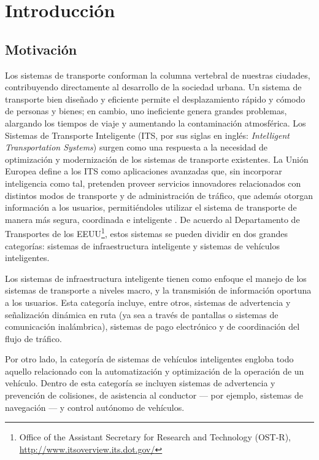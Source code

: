 \chapter{Introducción}
\section{Motivación}

Los sistemas de transporte conforman la columna vertebral de nuestras ciudades, contribuyendo directamente al desarrollo de la sociedad urbana. Un sistema de transporte bien diseñado y eficiente permite el desplazamiento rápido y cómodo de personas y bienes; en cambio, uno ineficiente genera grandes problemas, alargando los tiempos de viaje y aumentando la contaminación atmosférica.
Los Sistemas de Transporte Inteligente (ITS, por sus siglas en inglés: \textit{Intelligent Transportation Systems}) surgen como una respuesta a la necesidad de optimización y modernización de los sistemas de transporte existentes. La Unión Europea define a los ITS como aplicaciones avanzadas que, sin incorporar inteligencia como tal, pretenden proveer servicios innovadores relacionados con distintos modos de transporte y de administración de tráfico, que además otorgan información a los usuarios, permitiéndoles utilizar el sistema de transporte de manera más segura, coordinada e inteligente \cite{eudirective}. De acuerdo al Departamento de Transportes de los EEUU\footnote{Office of the Assistant Secretary for Research and Technology (OST-R), \url{http://www.itsoverview.its.dot.gov/}}, estos sistemas se pueden dividir en dos grandes categorías: sistemas de infraestructura inteligente y sistemas de vehículos inteligentes.

Los sistemas de infraestructura inteligente tienen como enfoque el manejo de los sistemas de transporte a niveles macro, y la transmisión de información oportuna a los usuarios. Esta categoría incluye, entre otros, sistemas de advertencia y señalización dinámica en ruta (ya sea a través de pantallas o sistemas de comunicación inalámbrica), sistemas de pago electrónico y de coordinación del flujo de tráfico.

Por otro lado, la categoría de sistemas de vehículos inteligentes engloba todo aquello relacionado con la automatización y optimización de la operación de un vehículo. Dentro de esta categoría se incluyen sistemas de advertencia y prevención de colisiones, de asistencia al conductor --- por ejemplo, sistemas de navegación --- y control autónomo de vehículos.

